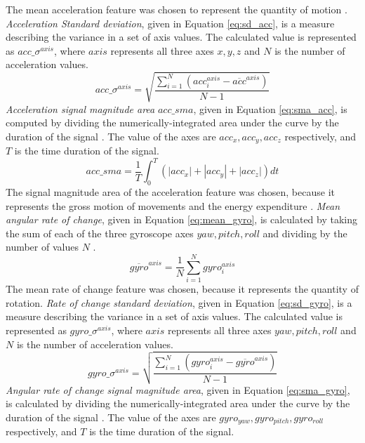 The mean acceleration feature was chosen to represent the quantity of motion \cite{Arif2015}.
\emph{Acceleration Standard deviation}, given in Equation \ref{eq:sd_acc}, is a measure describing the variance in a set of axis values. The calculated value is represented as $acc\_\sigma^{axis}$, where $axis$ represents all three axes $x,y,z$ and $N$ is the number of acceleration values.
\begin{equation}\label{eq:sd_acc}
acc\_\sigma^{axis} = \sqrt{\frac{\sum_{i=1}^{N}(acc^{axis}_i - \overline{acc}^{axis})}{N - 1}}
\end{equation}
\emph{Acceleration signal magnitude area} $acc\_sma$, given in Equation \ref{eq:sma_acc}, is computed by dividing the numerically-integrated area under the curve by the duration of the signal \cite{Totty2017}. The value of the axes are $acc_x,acc_y,acc_z$ respectively, and $T$ is the time duration of the signal.
\begin{equation}\label{eq:sma_acc}
acc\_sma = \frac{1}{T}\int_{0}^{T}(|acc_x|+|acc_y|+|acc_z|)dt
\end{equation}
The signal magnitude area of the acceleration feature was chosen, because it represents the gross motion of movements and the energy expenditure \cite{Jeran2016}. \emph{Mean angular rate of change}, given in Equation \ref{eq:mean_gyro}, is calculated by taking the sum of each of the three gyroscope axes $yaw, pitch, roll$ and dividing by the number of values $N$ \cite{Totty2017}.
\begin{equation}\label{eq:mean_gyro}
\overline{gyro}^{axis} = \frac{1}{N}\sum_{i=1}^{N}gyro^{axis}_i
\end{equation}
The mean rate of change feature was chosen, because it represents the quantity of rotation.
\emph{Rate of change standard deviation}, given in Equation \ref{eq:sd_gyro}, is a measure describing the variance in a set of axis values. The calculated value is represented as $gyro\_\sigma^{axis}$, where $axis$ represents all three axes $yaw,pitch,roll$ and $N$ is the number of acceleration values.
\begin{equation}\label{eq:sd_gyro}
gyro\_\sigma^{axis} = \sqrt{\frac{\sum_{i=1}^{N}(gyro^{axis}_i - \overline{gyro}^{axis})}{N - 1}}
\end{equation}
\emph{Angular rate of change signal magnitude area}, given in Equation \ref{eq:sma_gyro}, is calculated by dividing the numerically-integrated area under the curve by the duration of the signal \cite{Totty2017}. The value of the axes are $gyro_{yaw},gyro_{pitch},gyro_{roll}$ respectively, and $T$ is the time duration of the signal.
